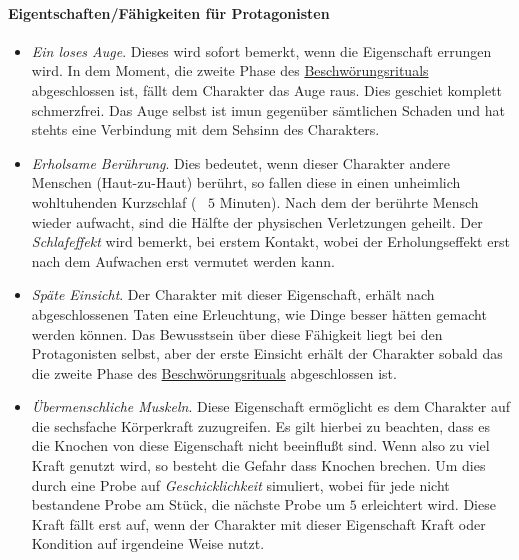         \paragraph{Eigentschaften/Fähigkeiten für Protagonisten}
            \begin{itemize}
                \item \emph{Ein loses Auge}. Dieses wird sofort bemerkt, wenn die Eigenschaft errungen wird. In dem Moment, die zweite Phase des \hyperref[sons:kult-von-colthubor:berschwoerungsritual]{Beschwörungsrituals} abgeschlossen ist, fällt dem Charakter das Auge raus. Dies geschiet komplett schmerzfrei. Das Auge selbst ist imun gegenüber sämtlichen Schaden und hat stehts eine Verbindung mit dem Sehsinn des Charakters.
                \item \emph{Erholsame Berührung}. Dies bedeutet, wenn dieser Charakter andere Menschen (Haut-zu-Haut) berührt, so fallen diese in einen unheimlich wohltuhenden Kurzschlaf (~ $5$ Minuten). Nach dem der berührte Mensch wieder aufwacht, sind die Hälfte der physischen Verletzungen geheilt. Der \emph{Schlafeffekt} wird bemerkt, bei erstem Kontakt, wobei der Erholungseffekt erst nach dem Aufwachen erst vermutet werden kann.
                \item \emph{Späte Einsicht}. Der Charakter mit dieser Eigenschaft, erhält nach abgeschlossenen Taten eine Erleuchtung, wie Dinge besser hätten gemacht werden können. Das Bewusstsein über diese Fähigkeit liegt bei den Protagonisten selbst, aber der erste Einsicht erhält der Charakter sobald das die zweite Phase des \hyperref[sons:kult-von-colthubor:beschwoerungsritual]{Beschwörungsrituals} abgeschlossen ist.
                \item \emph{Übermenschliche Muskeln}. Diese Eigenschaft ermöglicht es dem Charakter auf die sechsfache Körperkraft zuzugreifen. Es gilt hierbei zu beachten, dass es die Knochen von diese Eigenschaft nicht beeinflußt sind. Wenn also zu viel Kraft genutzt wird, so besteht die Gefahr dass Knochen brechen. Um dies durch eine Probe auf \emph{Geschicklichkeit} simuliert, wobei für jede nicht bestandene Probe am Stück, die nächste Probe um $5$ erleichtert wird. Diese Kraft fällt erst auf, wenn der Charakter mit dieser Eigenschaft Kraft oder Kondition auf irgendeine Weise nutzt.
            \end{itemize}

